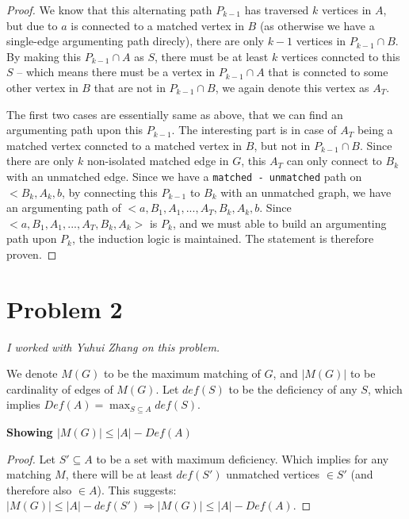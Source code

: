 \documentclass[11pt]{article}
\newcommand{\ilc}{\texttt}
\begin{document}
\begin{proof}
We know that this alternating path $P_{k-1}$ has traversed $k$ vertices in $A$, but due to $a$ is connected to a matched vertex in $B$ (as otherwise we have a single-edge argumenting path direcly), there are only $k-1$ vertices in $P_{k-1} \cap B$. By making this $P_{k-1} \cap A$ as $S$, there must be at least $k$ vertices conncted to this $S$ -- which means there must be a vertex in $P_{k-1} \cap A$ that is conncted to some other vertex in $B$ that are not in $P_{k-1} \cap B$, we again denote this vertex as $A_T$.

The first two cases are essentially same as above, that we can find an argumenting path upon this $P_{k-1}$. The interesting part is in case of $A_T$ being a matched vertex conncted to a matched vertex in $B$, but not in $P_{k-1} \cap B$. Since there are only $k$ non-isolated matched edge in $G$, this $A_T$ can only connect to $B_k$ with an unmatched edge. Since we have a \ilc{matched - unmatched} path on $<B_k, A_k, b$, by connecting this $P_{k-1}$ to $B_k$ with an unmatched graph, we have an argumenting path of $<a, B_1, A_1, ..., A_T, B_k, A_k, b$. Since $<a, B_1, A_1, ..., A_T, B_k, A_k>$ is $P_k$, and we must able to build an argumenting path upon $P_k$, the induction logic is maintained. The statement is therefore proven.


\end{proof}


\section{Problem 2}

\textit{I worked with Yuhui Zhang on this problem.\newline}



We denote $M(G)$ to be the maximum matching of $G$, and $|M(G)|$ to be cardinality of edges of $M(G)$. Let $def(S)$ to be the deficiency of any $S$, which implies $Def(A) = \max_{S \subseteq A} def(S)$.\newline


\textbf{Showing $|M(G)| \leq |A| - Def(A)$}
\begin{proof}
Let $S' \subseteq A$ to be a set with maximum deficiency. Which implies for any matching $M$, there will be at least $def(S')$ unmatched vertices $\in S'$ (and therefore also $\in A$). This suggests: $|M(G)| \leq |A| - def(S') \Longrightarrow |M(G)| \leq |A| - Def(A)$.

\end{proof}
\end{document}
